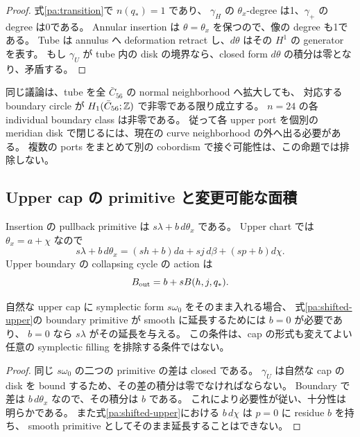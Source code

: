 \begin{proof}
式\eqref{pa:transition}で $n(q_*)=1$ であり、
$\gamma_H$ の $\theta_x$-degree は1、$\gamma_+$ の degree は0である。
Annular insertion は $\theta=\theta_x$ を保つので、像の degree も1である。
Tube は annulus へ deformation retract し、$d\theta$ はその $H^1$ の generator を表す。
もし $\gamma_U$ が tube 内の disk の境界なら、closed form $d\theta$ の積分は零となり、矛盾する。
\end{proof}

同じ議論は、tube を全 $\bar C_{56}$ の normal neighborhood へ拡大しても、
対応する boundary circle が $H_1(\bar C_{56};\mathbb Z)$ で非零である限り成立する。
$n=24$ の各 individual boundary class は非零である。
従って各 upper port を個別の meridian disk で閉じるには、現在の curve neighborhood の外へ出る必要がある。
複数の ports をまとめて別の cobordism で接ぐ可能性は、この命題では排除しない。

\subsection{Upper cap の primitive と変更可能な面積}

Insertion の pullback primitive は $s\lambda+b\,d\theta_x$ である。
Upper chart では $\theta_x=a+\chi$ なので
\begin{equation}\label{pa:shifted-upper}
 s\lambda+b\,d\theta_x
 =(sh+b)da+sj\,d\beta+(sp+b)d\chi.
\end{equation}
Upper boundary の collapsing cycle の action は
\[
 B_{\rm out}=b+sB(h,j,q_*).
\]

\begin{proposition}\label{pa:primitive-obstruction}
自然な upper cap に symplectic form $s\omega_0$ をそのまま入れる場合、
式\eqref{pa:shifted-upper}の boundary primitive が smooth に延長するためには $b=0$ が必要であり、
$b=0$ なら $s\lambda$ がその延長を与える。
この条件は、cap の形式も変えてよい任意の symplectic filling を排除する条件ではない。
\end{proposition}

\begin{proof}
同じ $s\omega_0$ の二つの primitive の差は closed である。
$\gamma_U$ は自然な cap の disk を bound するため、その差の積分は零でなければならない。
Boundary で差は $b\,d\theta_x$ なので、その積分は $b$ である。
これにより必要性が従い、十分性は明らかである。
また式\eqref{pa:shifted-upper}における $b\,d\chi$ は $p=0$ に residue $b$ を持ち、
smooth primitive としてそのまま延長することはできない。
\end{proof}

